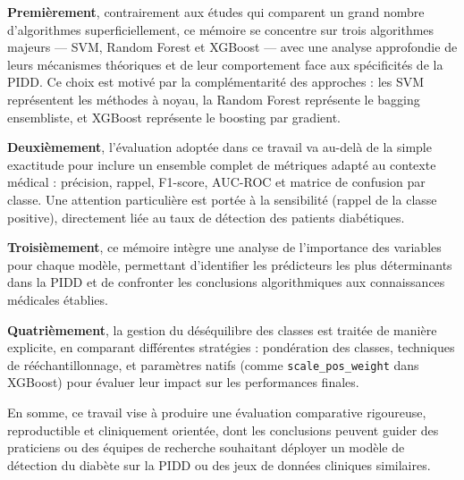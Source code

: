 \textbf{Premièrement}, contrairement aux études qui comparent un grand nombre d'algorithmes
superficiellement, ce mémoire se concentre sur trois algorithmes majeurs — SVM, Random
Forest et XGBoost — avec une analyse approfondie de leurs mécanismes théoriques et de leur
comportement face aux spécificités de la PIDD. Ce choix est motivé par la complémentarité
des approches : les SVM représentent les méthodes à noyau, la Random Forest représente le
bagging ensembliste, et XGBoost représente le boosting par gradient.

\textbf{Deuxièmement}, l'évaluation adoptée dans ce travail va au-delà de la simple
exactitude pour inclure un ensemble complet de métriques adapté au contexte médical :
précision, rappel, F1-score, AUC-ROC et matrice de confusion par classe. Une attention
particulière est portée à la sensibilité (rappel de la classe positive), directement liée
au taux de détection des patients diabétiques.

\textbf{Troisièmement}, ce mémoire intègre une analyse de l'importance des variables pour
chaque modèle, permettant d'identifier les prédicteurs les plus déterminants dans la PIDD
et de confronter les conclusions algorithmiques aux connaissances médicales établies.

\textbf{Quatrièmement}, la gestion du déséquilibre des classes est traitée de manière
explicite, en comparant différentes stratégies : pondération des classes, techniques de
rééchantillonnage, et paramètres natifs (comme \texttt{scale\_pos\_weight} dans XGBoost)
pour évaluer leur impact sur les performances finales.

En somme, ce travail vise à produire une évaluation comparative rigoureuse, reproductible
et cliniquement orientée, dont les conclusions peuvent guider des praticiens ou des équipes
de recherche souhaitant déployer un modèle de détection du diabète sur la PIDD ou des
jeux de données cliniques similaires.

